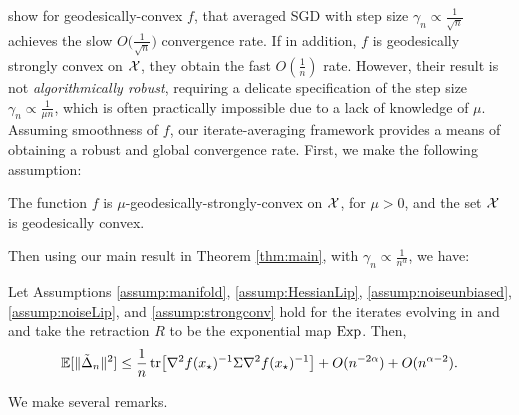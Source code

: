 \citet{zhang2016first} show for geodesically-convex $f$, that averaged SGD with step size $\gamma_n \propto \frac{1}{\sqrt{n}}$ achieves the slow $O\big(\frac{1}{\sqrt{n}}\big)$ convergence rate. If in addition, $f$ is geodesically strongly convex on $\mathcal{X}$, they obtain the fast $O(\frac{1}{n})$ rate. However, their result is not \textit{algorithmically robust}, requiring a delicate specification of the step size $\gamma_n \propto \frac{1}{\mu n}$, which is often practically impossible due to a lack of knowledge of $\mu$. Assuming smoothness of $f$, our iterate-averaging framework provides a means of obtaining a robust and global convergence rate. First, we make the following assumption:
 \vspace{-5.22pt}
\begin{assumption} \label{assump:strongconv}
The function $f$ is $\mu$-geodesically-strongly-convex on $\mathcal{X}$, for $\mu>0$, and the set $\mathcal{X}$ is geodesically convex.
\vspace*{-3pt}
\end{assumption}
Then using our main result in Theorem \ref{thm:main}, with $\gamma_n \propto \frac{1}{n^{\alpha}}$, we have:
\vspace*{-6pt}
\begin{proposition}   \label{prop:strongconvrate}
  Let Assumptions \ref{assump:manifold},
  \ref{assump:HessianLip},
  \ref{assump:noiseunbiased},
  \ref{assump:noiseLip}, and \ref{assump:strongconv}
  hold for the iterates evolving in  and  and take the retraction $R$ to be the exponential map $\Exp$. Then, \vspace{-5pt}
  \[
    \mathbb{E}[\Vert \tilde{\Delta}_n \Vert^2] \leq \frac{1}{n} \tr[\Hess f(x_\star)^{-1} \Sigma \Hess f(x_\star)^{-1}] + O(n^{-2\alpha}) + O(n^{\alpha-2}). \vspace{-5pt}
  \]
\end{proposition}
We make several remarks.
